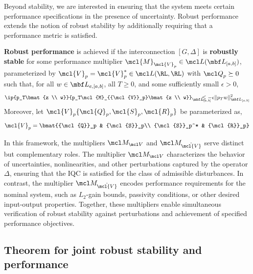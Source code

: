 Beyond stability, we are interested in ensuring that the system meets certain performance specifications in the presence of uncertainty. Robust performance extends the notion of robust stability by additionally requiring that a performance metric is satisfied.
\begin{definition}\label{def:robperf}
	\textbf{Robust performance} is achieved if the interconnection $[G,\Delta]$ is \textbf{robustly stable} for some performance multiplier $\mcl {M}_{{\mcl {V}_p}}\in\mcl L(\mbf L_{[a, b]})$, parameterized by ${\mcl{V}}_p = {\mcl{V}}^*_p\in \mcl L(\RL, \RL)$  with ${\mcl Q}_{p}\succeq 0$ such that, for all $w \in\mbf L_{e, [a, b]}$,  all $T \geq 0$, and some sufficiently small $\epsilon >0$,
	\begin{equation*}\ip{p_T\bmat{z \\ w}}{p_T\mcl{M}_{{\mcl{V}}_p}\bmat{z \\ w}}_{\mbf L_{[a, b]}} \!\!\!\!\!\!\!\!\!\!\!\!\leq -\epsilon \|p_Tw\|_{\mbf L_{[a, b]}}^2
	\end{equation*}
	Moreover, let ${\mcl{V}}_p\{{\mcl{Q}}_p, {\mcl{S}}_p, {\mcl{R}}_p\}$ be parameterized as,
	\begin{equation*}
		{\mcl{V}}_p = \bmat{{\mcl{Q}}_p &  {\mcl{S}}_p\\ {\mcl{S}}_p^* & {\mcl{R}}_p}
	\end{equation*}
\end{definition}
In this framework, the multipliers $\mcl M_{\mcl V}$ and $\mcl M_{\hat{\mcl{V}}}$ serve distinct but complementary roles. The multiplier $\mcl M_{\mcl V}$ characterizes the behavior of uncertainties, nonlinearities, and other perturbations captured by the operator $\Delta$, ensuring that the IQC is satisfied for the class of admissible disturbances. In contrast, the multiplier $\mcl M_{\hat{\mcl{V}}}$ encodes performance requirements for the nominal system, such as $L_2$-gain bounds, passivity conditions, or other desired input-output properties. Together, these multipliers enable simultaneous verification of robust stability against perturbations and achievement of specified performance objectives.

\subsection{Theorem for joint robust stability and performance}

